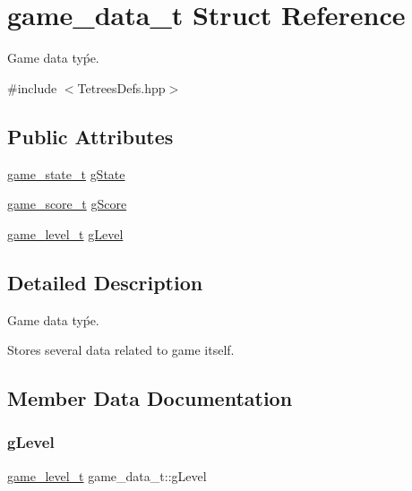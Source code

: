 \hypertarget{structgame__data__t}{}\section{game\+\_\+data\+\_\+t Struct Reference}
\label{structgame__data__t}


Game data tyṕe.  




{\ttfamily \#include $<$Tetrees\+Defs.\+hpp$>$}

\subsection*{Public Attributes}
\begin{DoxyCompactItemize}
\item 
\hyperlink{TetreesDefs_8hpp_aebae08b2e3a36f1452b33acaf1eaab40}{game\+\_\+state\+\_\+t} \hyperlink{structgame__data__t_a48253f7b6212e0ff99d5d5960b79476d}{g\+State}
\item 
\hyperlink{structgame__score__t}{game\+\_\+score\+\_\+t} \hyperlink{structgame__data__t_a70e04b66160685cc84bcdd30edb97e46}{g\+Score}
\item 
\hyperlink{structgame__level__t}{game\+\_\+level\+\_\+t} \hyperlink{structgame__data__t_a7918ec335ac715bcf7ec197920afe56b}{g\+Level}
\end{DoxyCompactItemize}


\subsection{Detailed Description}
Game data tyṕe. 

Stores several data related to game itself. 

\subsection{Member Data Documentation}
\mbox{\label{structgame__data__t_a7918ec335ac715bcf7ec197920afe56b}} 
\subsubsection{\texorpdfstring{g\+Level}{gLevel}}
{\footnotesize\ttfamily \hyperlink{structgame__level__t}{game\+\_\+level\+\_\+t} game\+\_\+data\+\_\+t\+::g\+Level}


